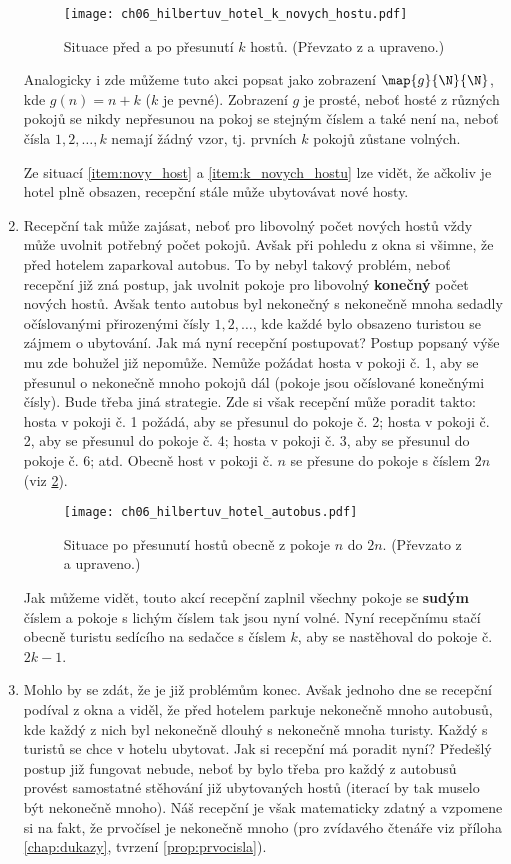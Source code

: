\begin{enumerate}[label=\textit{(\roman*)}]
    \begin{figure}[h]
        \centering
        \texttt{[image: ch06\_hilbertuv\_hotel\_k\_novych\_hostu.pdf]}
        \caption{Situace před a po přesunutí $k$ hostů. (Převzato z \cite{Rmoutil2022} a upraveno.)}
        \label{fig:hilbertuv_hotel_k_novych_hostu}
    \end{figure}
    Analogicky i zde můžeme tuto akci popsat jako zobrazení $\map{g}{\N}{\N}$, kde $g(n)=n+k$ ($k$ je pevné). Zobrazení $g$ je prosté, neboť hosté z různých pokojů se nikdy nepřesunou na pokoj se stejným číslem a také není na, neboť čísla $1,2,\dots,k$ nemají žádný vzor, tj. prvních $k$ pokojů zůstane volných.\par
    Ze situací \ref{item:novy_host} a \ref{item:k_novych_hostu} lze vidět, že ačkoliv je hotel plně obsazen, recepční stále může ubytovávat nové hosty.
    \item Recepční tak může zajásat, neboť pro libovolný počet nových hostů vždy může uvolnit potřebný počet pokojů. Avšak při pohledu z okna si všimne, že před hotelem zaparkoval autobus. To by nebyl takový problém, neboť recepční již zná postup, jak uvolnit pokoje pro libovolný \textbf{konečný} počet nových hostů. Avšak tento autobus byl nekonečný s nekonečně mnoha sedadly očíslovanými přirozenými čísly $1,2,\dots$, kde každé bylo obsazeno turistou se zájmem o ubytování. Jak má nyní recepční postupovat? Postup popsaný výše mu zde bohužel již nepomůže. Nemůže požádat hosta v pokoji č. 1, aby se přesunul o nekonečně mnoho pokojů dál (pokoje jsou očíslované konečnými čísly). Bude třeba jiná strategie. Zde si však recepční může poradit takto: hosta v pokoji č. 1 požádá, aby se přesunul do pokoje č. 2; hosta v pokoji č. 2, aby se přesunul do pokoje č. 4; hosta v pokoji č. 3, aby se přesunul do pokoje č. 6; atd. Obecně host v pokoji č. $n$ se přesune do pokoje s číslem $2n$ (viz \ref{fig:hilbertuv_hotel_autobus}).
    \begin{figure}[h]
        \centering
        \texttt{[image: ch06\_hilbertuv\_hotel\_autobus.pdf]}
        \caption{Situace po přesunutí hostů obecně z pokoje $n$ do $2n$. (Převzato z \cite{Rmoutil2022} a upraveno.)}
        \label{fig:hilbertuv_hotel_autobus}
    \end{figure}
    Jak můžeme vidět, touto akcí recepční zaplnil všechny pokoje se \textbf{sudým} číslem a pokoje s lichým číslem tak jsou nyní volné. Nyní recepčnímu stačí obecně turistu sedícího na sedačce s číslem $k$, aby se nastěhoval do pokoje č. $2k-1$.
    \item Mohlo by se zdát, že je již problémům konec. Avšak jednoho dne se recepční podíval z okna a viděl, že před hotelem parkuje nekonečně mnoho autobusů, kde každý z nich byl nekonečně dlouhý s nekonečně mnoha turisty. Každý s turistů se chce v hotelu ubytovat. Jak si recepční má poradit nyní? Předešlý postup již fungovat nebude, neboť by bylo třeba pro každý z autobusů provést samostatné stěhování již ubytovaných hostů (iterací by tak muselo být nekonečně mnoho). Náš recepční je však matematicky zdatný a vzpomene si na fakt, že prvočísel je nekonečně mnoho (pro zvídavého čtenáře viz příloha \ref{chap:dukazy}, tvrzení \ref{prop:prvocisla}).

\end{enumerate}
